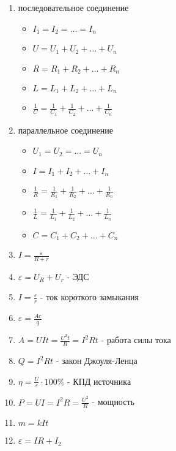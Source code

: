 \documentclass{proc}
\begin{document}
\begin{enumerate}
    \item последовательное соединение
        \begin{itemize}
            \item $\displaystyle I_1=I_2=\ldots=I_n$
            \item $\displaystyle U = U_1 + U_2+\ldots+U_n$
            \item $\displaystyle R = R_1 + R_2+\ldots+R_n$
            \item $\displaystyle L = L_1 + L_2+\ldots+L_n$
            \item $\displaystyle \frac1C=\frac1{C_1}+\frac1{C_2}+\ldots+\frac1{C_n}$
        \end{itemize}
    \item параллельное соединение
        \begin{itemize}
            \item $\displaystyle U_1=U_2=\ldots=U_n$
            \item $\displaystyle I = I_1 + I_2 + \ldots + I_n$
            \item $\displaystyle \frac{1}{R}=\frac{1}{R_1}+\frac{1}{R_2}+\ldots+\frac1{R_n}$
            \item $\displaystyle \frac1L=\frac1{L_1}+\frac1{L_2}+\ldots+\frac1{L_n}$
            \item $\displaystyle C = C_1 + C_2+\ldots+C_n$
        \end{itemize}
    \item $\displaystyle I = \frac{\varepsilon}{R+r}$
    \item $\displaystyle \varepsilon=U_R+U_r$ - ЭДС
    \item $\displaystyle I=\frac{\varepsilon}{r}$ - ток короткого замыкания
    \item $\displaystyle \varepsilon = \frac{Ac}{q}$
    \item $\displaystyle A = UIt = \frac{U^2t}{R}=I^2Rt$ - работа силы тока
    \item $\displaystyle Q=I^2Rt$ - закон Джоуля-Ленца
    \item $\displaystyle \eta=\frac U\varepsilon\cdot100\%$ - КПД источника
    \item $\displaystyle P = UI = I^2R = \frac{U^2}{R}$ - мощность
    \item $\displaystyle m=kIt$
    \item $\displaystyle \varepsilon=IR+I_2$
\end{enumerate}
\end{document}
